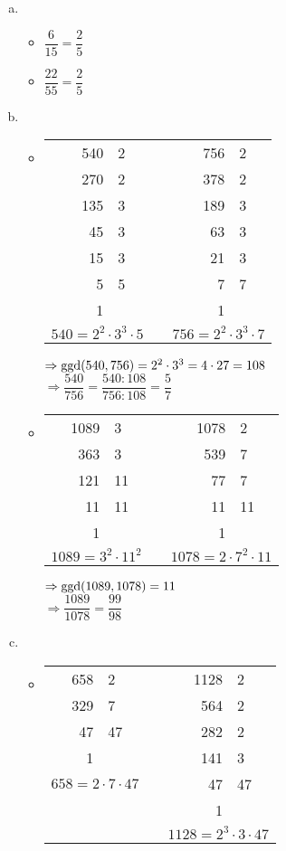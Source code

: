 \documentclass[12pt]{article}
\begin{document}
\begin{solution}
\begin{enumerate}[(a)]
  \item \begin{itemize}
    \item $\dfrac{6}{15}=\dfrac{2}{5}$
    \item $\dfrac{22}{55}=\dfrac{2}{5}$
  \end{itemize}
  \item \begin{itemize}
    \item
    \begin{tabular}[t]{r|lp{2cm}r|l}
    540 & 2  & &  756 & 2\\
    270 & 2  & &  378 & 2\\
    135 & 3  & &  189 & 3\\
     45 & 3  & &   63 & 3\\
     15 & 3  & &   21 & 3\\
      5 & 5  & &    7 & 7\\
      1 &    & &    1 &  \\
    \multicolumn{2}{c}{$540=2^2\cdot 3^3\cdot 5$}
    &&\multicolumn{2}{c}{$756=2^2\cdot 3^3 \cdot 7$}
    \end{tabular}
    
    $\Rightarrow \ggd(540,756)=2^2\cdot 3^3 = 4\cdot 27= 108$\\[1em]
    $\Rightarrow \dfrac{540}{756}=\dfrac{540:108}{756:108}=\dfrac{5}{7}$
    \item
    \begin{tabular}[t]{r|lp{2cm}r|l}
    1089 & 3  & & 1078 & 2  \\
     363 & 3  & &  539 & 7  \\
     121 & 11 & &   77 & 7  \\
      11 & 11 & &   11 & 11 \\
       1 &    & &    1 &    \\
    \multicolumn{2}{c}{$1089=3^2\cdot 11^2$}
    &&\multicolumn{2}{c}{$1078=2\cdot 7^2\cdot 11$}
    \end{tabular}
    
    $\Rightarrow \ggd(1089,1078)=11$\\[1em]
    $\Rightarrow \dfrac{1089}{1078}=\dfrac{99}{98}$
  \end{itemize}
  \item \begin{itemize}
    \item
    \begin{tabular}[t]{r|lp{2cm}r|l}
    658 & 2  & & 1128 &  2\\
    329 & 7  & &  564 &  2\\
     47 & 47 & &  282 &  2\\
      1 &    & &  141 &  3\\
    \multicolumn{2}{c}{$658=2\cdot 7\cdot 47$}& &   47 & 47\\
    \multicolumn{2}{c}{}& &    1 &   \\
    \multicolumn{2}{c}{}
    &&\multicolumn{2}{c}{$1128=2^3\cdot 3\cdot 47$}
    \end{tabular}
    

\end{itemize}
\end{enumerate}
\end{solution}
\end{document}
